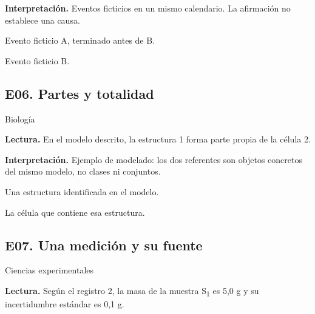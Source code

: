 \textbf{Interpretación.} Eventos ficticios en un mismo calendario. La afirmación no establece una causa.

\begin{description}[font=\normalfont\bfseries,leftmargin=10mm]

\item[1] Evento ficticio A, terminado antes de B.

\item[2] Evento ficticio B.

\end{description}

\vspace{6mm}

\subsection{E06. Partes y totalidad}

{\small\sffamily\color{KalaAcento}Biología}


\textbf{Lectura.} En el modelo descrito, la estructura 1 forma parte propia de la célula 2.

\textbf{Interpretación.} Ejemplo de modelado: los dos referentes son objetos concretos del mismo modelo, no clases ni conjuntos.

\begin{description}[font=\normalfont\bfseries,leftmargin=10mm]

\item[1] Una estructura identificada en el modelo.

\item[2] La célula que contiene esa estructura.

\end{description}

\clearpage

\subsection{E07. Una medición y su fuente}

{\small\sffamily\color{KalaAcento}Ciencias experimentales}


\textbf{Lectura.} Según el registro 2, la masa de la muestra S\textsubscript{1} es 5,0 g y su incertidumbre estándar es 0,1 g.

